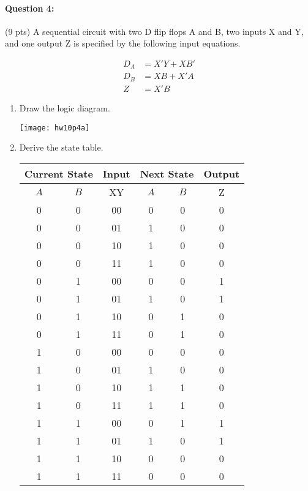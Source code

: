 \documentclass[12pt,letterpaper,titlepage]{report}
\begin{document}
\begin{raggedright}
\clearpage

\paragraph{Question 4:}
(9 pts) A sequential circuit with two D flip flops A and B, two inputs X and Y, and one output Z is specified by the following input equations.

\begin{align*}
D_A&=X'Y+XB'\\
D_B&=XB+X'A\\
Z&=X'B
\end{align*}

\begin{enumerate} [noitemsep, label=\alph*)]
\item Draw the logic diagram.
\begin{center}
\texttt{[image: hw10p4a]}
\end{center}

\pagebreak 

\item Derive the state table.
\begin{center}
\def\arraystretch{1.5}
\begin{tabular}{|c|c|c|c|c|c|}\hline 
\multicolumn{2}{|c|}{Current State} & Input & \multicolumn{2}{|c|}{Next State} & Output \\\hline 
$A$ & $B$ & XY & $A$ & $B$ & Z \\\hline 
0 & 0 & 00 & 0 & 0 & 0 \\\hline 
0 & 0 & 01 & 1 & 0 & 0 \\\hline 
0 & 0 & 10 & 1 & 0 & 0 \\\hline 
0 & 0 & 11 & 1 & 0 & 0 \\\hline 
0 & 1 & 00 & 0 & 0 & 1 \\\hline 
0 & 1 & 01 & 1 & 0 & 1 \\\hline 
0 & 1 & 10 & 0 & 1 & 0 \\\hline 
0 & 1 & 11 & 0 & 1 & 0 \\\hline 
1 & 0 & 00 & 0 & 0 & 0 \\\hline 
1 & 0 & 01 & 1 & 0 & 0 \\\hline 
1 & 0 & 10 & 1 & 1 & 0 \\\hline 
1 & 0 & 11 & 1 & 1 & 0 \\\hline 
1 & 1 & 00 & 0 & 1 & 1 \\\hline 
1 & 1 & 01 & 1 & 0 & 1 \\\hline 
1 & 1 & 10 & 0 & 0 & 0 \\\hline 
1 & 1 & 11 & 0 & 0 & 0 \\\hline 
\end{tabular} 
\end{center}


\end{enumerate}
\end{raggedright}
\end{document}
